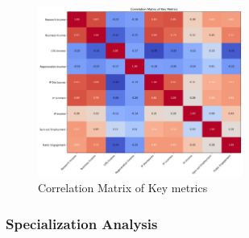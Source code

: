 \documentclass[journal,onecolumn, 10pt,draftclsnofoot]{IEEEtran}
\begin{document}
\begin{figure}[h]
\centering
\includegraphics[width=0.6\textwidth]{Fig/figure36.correlation_matrix.png}
\caption{Correlation Matrix of Key metrics}
\label{fig:correlation-matrix}
\end{figure}

\subsubsection{Specialization Analysis}
\end{document}
